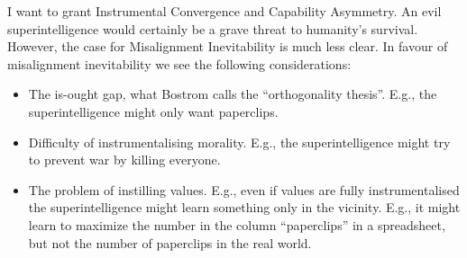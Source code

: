 \documentclass[11pt]{article}
\begin{document}
I want to grant Instrumental Convergence and Capability Asymmetry. An evil superintelligence would certainly be a grave threat to humanity's survival. However, the case for Misalignment Inevitability is much less clear. In favour of misalignment inevitability we see the following considerations:
\begin{itemize}
    \item The is-ought gap, what Bostrom calls the ``orthogonality thesis''. E.g., the superintelligence might only want paperclips.
    \item Difficulty of instrumentalising morality. E.g., the superintelligence might try to prevent war by killing everyone.
    \item The problem of instilling values. E.g., even if values are fully instrumentalised the superintelligence might learn something only in the vicinity. E.g., it might learn to maximize the number in the column ``paperclips'' in a spreadsheet, but not the number of paperclips in the real world.
\end{itemize}
\end{document}
